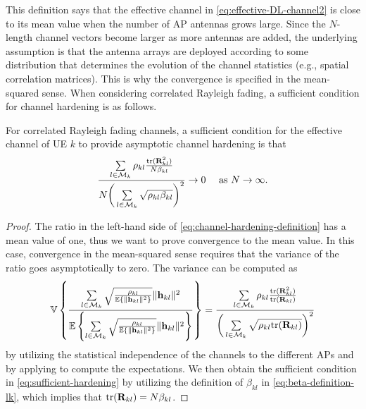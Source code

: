 This definition says that the effective channel in \eqref{eq:effective-DL-channel2} is close to its mean value when the number of AP antennas grows large.
Since the $N$-length channel vectors become larger as more antennas are added, the underlying assumption is that the antenna arrays are deployed according to some distribution that determines the evolution of the channel statistics (e.g., spatial correlation matrices). This is why the convergence is specified in the mean-squared sense. When considering correlated Rayleigh fading, a sufficient condition for channel hardening is as follows.

\begin{lemma}
For correlated Rayleigh fading channels, a sufficient condition for the effective channel of \gls{UE} $k$ to provide asymptotic channel hardening is that
\begin{equation} \label{eq:sufficient-hardening}
\frac{ \sum\limits_{l \in \mathcal{M}_k} \rho_{kl} \frac{\mathrm{tr} ( \mathbf{R}_{kl}^2 ) }{N \beta_{kl} }
}{N \bigg( \sum\limits_{l \in \mathcal{M}_k} \sqrt{\rho_{kl} \beta_{kl}} 
\bigg)^2 } \to 0 \quad  \textrm{ as } N \to \infty.
\end{equation}
\end{lemma}
\begin{proof}
The ratio in the left-hand side of \eqref{eq:channel-hardening-definition} has a mean value of one, thus we want to prove convergence to the mean value. In this case, convergence in the mean-squared sense requires that the variance of the ratio goes asymptotically to zero. The variance can be computed as
\begin{equation}
\mathbb{V}\left\{ 
\frac{ \sum\limits_{l \in \mathcal{M}_k} \sqrt{\frac{\rho_{kl}}{\mathbb{E} \{\| \mathbf{h}_{kl} \|^2 \}} } \| \mathbf{h}_{kl} \|^2 }{ \mathbb{E} \left\{ \sum\limits_{l \in \mathcal{M}_k} \sqrt{\frac{\rho_{kl}}{\mathbb{E} \{\| \mathbf{h}_{kl} \|^2 \}} } \| \mathbf{h}_{kl} \|^2  \right\} } 
\right\} = \frac{ \sum\limits_{l \in \mathcal{M}_k} \rho_{kl} \frac{\mathrm{tr} ( \mathbf{R}_{kl}^2 ) }{\mathrm{tr} ( \mathbf{R}_{kl} ) }
}{ \bigg( \sum\limits_{l \in \mathcal{M}_k} \sqrt{\rho_{kl} \mathrm{tr} ( \mathbf{R}_{kl} )} 
\bigg)^2 } 
\end{equation}
by utilizing the statistical independence of the channels to the different \glspl{AP} and by applying \cite[Lemma B.14]{massivemimobook} to compute the expectations. We then obtain the sufficient condition in \eqref{eq:sufficient-hardening} by utilizing the definition of $\beta_{kl}$ in \eqref{eq:beta-definition-lk}, which implies that $ \mathrm{tr} ( \mathbf{R}_{kl} ) = N \beta_{kl}$.
\end{proof}




